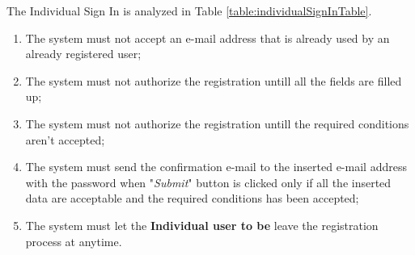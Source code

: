 The Individual Sign In is analyzed in Table \ref{table:individualSignInTable}.

\begin{enumerate}
  \item The system must not accept an e-mail address that is already used by an already registered user;
  \item The system must not authorize the registration untill all the fields are filled up;
  \item The system must not authorize the registration untill the required conditions aren't accepted;
  \item The system must send the confirmation e-mail to the inserted e-mail address with the password when "\textit{Submit}" button is clicked only if all the inserted data are acceptable and the required conditions has been accepted;
  \item The system must let the \textbf{Individual user to be} leave the registration process at anytime.
\end{enumerate}

